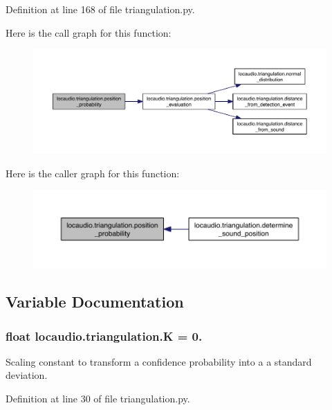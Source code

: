 Definition at line 168 of file triangulation.\-py.



Here is the call graph for this function\-:\nopagebreak
\begin{figure}[H]
\begin{center}
\leavevmode
\includegraphics[width=350pt]{namespacelocaudio_1_1triangulation_ab85ddfec0f2c6c1c20134d90a6fe874a_cgraph}
\end{center}
\end{figure}




Here is the caller graph for this function\-:\nopagebreak
\begin{figure}[H]
\begin{center}
\leavevmode
\includegraphics[width=350pt]{namespacelocaudio_1_1triangulation_ab85ddfec0f2c6c1c20134d90a6fe874a_icgraph}
\end{center}
\end{figure}




\subsection{Variable Documentation}
\hypertarget{namespacelocaudio_1_1triangulation_ac85bcbed961d15baa586ddc0192860bb}{
\subsubsection[{K}]{\setlength{\rightskip}{0pt plus 5cm}float locaudio.\-triangulation.\-K = 0.}}\label{namespacelocaudio_1_1triangulation_ac85bcbed961d15baa586ddc0192860bb}


Scaling constant to transform a confidence probability into a a standard deviation. 



Definition at line 30 of file triangulation.\-py.

